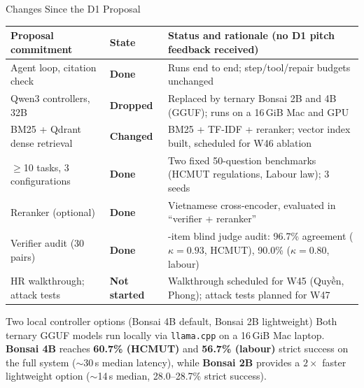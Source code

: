 \documentclass[aspectratio=1610,11pt]{beamer}
\renewcommand{\arraystretch}{1.15}
\begin{document}
\begin{frame}{Changes Since the D1 Proposal}
  \footnotesize\renewcommand{\arraystretch}{1.02}
  \begin{tabularx}{\textwidth}{@{}>{\raggedright\arraybackslash}p{4.0cm}>{\bfseries}p{1.9cm}>{\raggedright\arraybackslash}X@{}}
    \toprule Proposal commitment & State & Status and rationale (no D1 pitch feedback received)\\\midrule
    Agent loop, citation check & \textcolor{successgreen}{Done} & Runs end to end; step/tool/repair budgets unchanged\\
    Qwen3 controllers, 32B & \textcolor{dangerred}{Dropped} & Replaced by ternary Bonsai 2B and 4B (GGUF); runs on a 16\,GiB Mac and GPU\\
    BM25 + Qdrant dense retrieval & \textcolor{warnorange}{Changed} & BM25 + TF-IDF + reranker; vector index built, scheduled for W46 ablation\\
    $\ge$10 tasks, 3 configurations & \textcolor{successgreen}{Done} & Two fixed 50-question benchmarks (HCMUT regulations, Labour law); 3 seeds\\
    Reranker (optional) & \textcolor{successgreen}{Done} & Vietnamese cross-encoder, evaluated in ``verifier + reranker''\\
    Verifier audit (30 pairs) & \textcolor{successgreen}{Done} & 60-item blind judge audit: 96.7\% agreement ($\kappa=0.93$, HCMUT), 90.0\% ($\kappa=0.80$, labour)\\
    HR walkthrough; attack tests & \textcolor{warnorange}{Not started} & Walkthrough scheduled for W45 (Quyền, Phong); attack tests planned for W47\\
    \bottomrule
  \end{tabularx}
  \vspace{3pt}

  \begin{block}{Two local controller options (Bonsai 4B default, Bonsai 2B lightweight)}
    \scriptsize Both ternary GGUF models run locally via \texttt{llama.cpp} on a 16\,GiB Mac laptop. \textbf{Bonsai 4B} reaches \textbf{60.7\% (HCMUT)} and \textbf{56.7\% (labour)} strict success on the full system ($\sim$30\,s median latency), while \textbf{Bonsai 2B} provides a $2\times$ faster lightweight option ($\sim$14\,s median, 28.0--28.7\% strict success).
  \end{block}
\end{frame}
\end{document}
